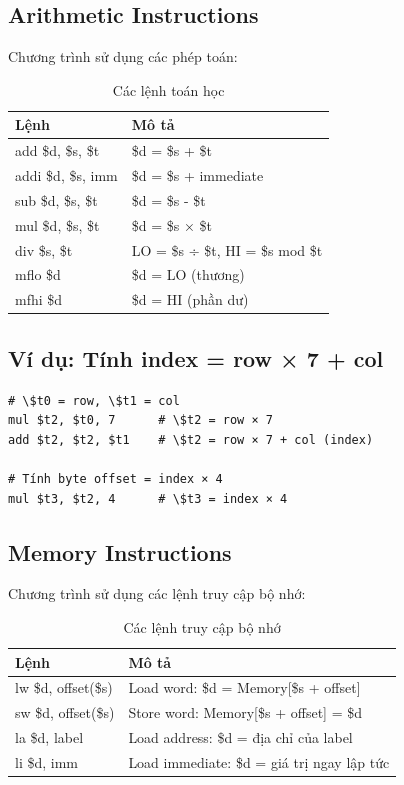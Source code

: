 \subsection{Arithmetic Instructions}

Chương trình sử dụng các phép toán:

\begin{table}[H]
\centering
\begin{tabular}{|l|l|}
\hline
\textbf{Lệnh} & \textbf{Mô tả} \\
\hline
add \$d, \$s, \$t & \$d = \$s + \$t \\
\hline
addi \$d, \$s, imm & \$d = \$s + immediate \\
\hline
sub \$d, \$s, \$t & \$d = \$s - \$t \\
\hline
mul \$d, \$s, \$t & \$d = \$s × \$t \\
\hline
div \$s, \$t & LO = \$s ÷ \$t, HI = \$s mod \$t \\
\hline
mflo \$d & \$d = LO (thương) \\
\hline
mfhi \$d & \$d = HI (phần dư) \\
\hline
\end{tabular}
\caption{Các lệnh toán học}
\end{table}

\subsection{Ví dụ: Tính index = row × 7 + col}

\begin{verbatim}
# \$t0 = row, \$t1 = col
mul $t2, $t0, 7      # \$t2 = row × 7
add $t2, $t2, $t1    # \$t2 = row × 7 + col (index)

# Tính byte offset = index × 4
mul $t3, $t2, 4      # \$t3 = index × 4
\end{verbatim}

\subsection{Memory Instructions}

Chương trình sử dụng các lệnh truy cập bộ nhớ:

\begin{table}[H]
\centering
\begin{tabular}{|l|l|}
\hline
\textbf{Lệnh} & \textbf{Mô tả} \\
\hline
lw \$d, offset(\$s) & Load word: \$d = Memory[\$s + offset] \\
\hline
sw \$d, offset(\$s) & Store word: Memory[\$s + offset] = \$d \\
\hline
la \$d, label & Load address: \$d = địa chỉ của label \\
\hline
li \$d, imm & Load immediate: \$d = giá trị ngay lập tức \\
\hline
\end{tabular}
\caption{Các lệnh truy cập bộ nhớ}
\end{table}

